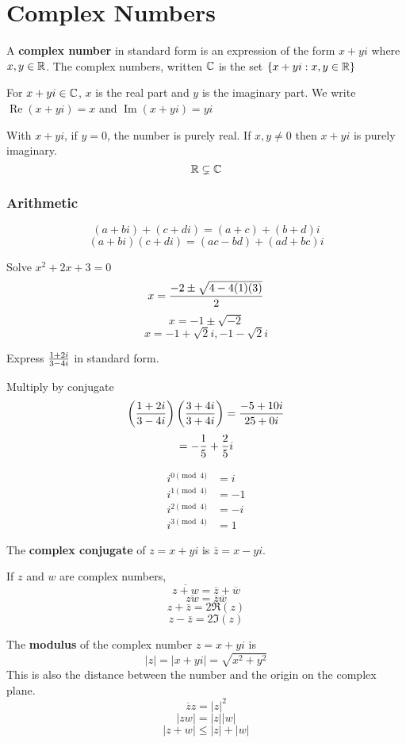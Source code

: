 \documentclass[english, 12pt]{article}
\begin{document}
\section{Complex Numbers}
\begin{defn}
A \textbf{complex number} in standard form is an expression of the form $x+yi$ where $x,y \in {\mathbb{R}}$. The complex numbers, written ${\mathbb{C}}$ is the set $\{x+yi : x,y \in {\mathbb{R}} \}$
\end{defn}
\begin{exmp}
For $x+yi \in {\mathbb{C}}$, $x$ is the real part and $y$ is the imaginary part. We write $\operatorname{Re}(x+yi) = x$ and $\operatorname{Im}(x+yi) = yi$
\end{exmp}
\begin{defn}
With $x+yi$, if $y=0$, the number is purely real. If $x,y \neq 0$ then $x+yi$ is purely imaginary. 
\[ {\mathbb{R}} \subsetneq {\mathbb{C}} \]
\end{defn}
\subsubsection*{Arithmetic}
\[(a+bi) + (c+di) = (a+c) + (b+d)i \]
\[(a+bi)(c+di) = (ac-bd) + (ad + bc)i \]
\begin{exmp}
Solve $x^2 + 2x + 3 = 0$
\[ x = \frac{-2 \pm \sqrt{4 - 4(1)(3)}}{2} \]
\[ x = -1 \pm \sqrt{-2} \]
\[ x = -1 + \sqrt{2} i, -1 - \sqrt{2}i \]
\end{exmp}
\begin{exmp}
Express $\frac{1+2i}{3-4i}$ in standard form.
\begin{sol}
Multiply by conjugate
\[\left(\frac{1+2i}{3-4i}\right)\left(\frac{3+4i}{3+4i}\right) = \frac{-5 + 10i}{25 + 0i} \]
\[ = - \frac{1}{5} + \frac{2}{5} i \]
\end{sol}
\end{exmp}
\begin{thrm}
\begin{align*}
i^{0 \pmod 4} &= i\\
i^{1 \pmod 4} &= -1\\
i^{2 \pmod 4} &= -i\\
i^{3 \pmod 4} &= 1
\end{align*}
\end{thrm}
\begin{defn}
The \textbf{complex conjugate} of $z = x + yi$ is $\overline z = x - yi$.
\end{defn}
If $z$ and $w$ are complex numbers,
\[ \overline{z + w} = \overline{z} + \overline{w} \]
\[ \overline{zw} = \overline{z}\overline{w}\]
\[ z + \overline{z} = 2 \Re(z)\]
\[ z - \overline{z} = 2 \Im(z)\]
\begin{defn}
The \textbf{modulus} of the complex number $z = x + yi$ is 
\[ |z| = |x + yi| = \sqrt{x^2 + y^2} \]
This is also the distance between the number and the origin on the complex plane.
\[ \overline{z} z = |z|^2\]
\[ |zw| = |z| |w|\]
\[ |z+w| \leq |z| + |w|\]
\end{defn}
\end{document}
